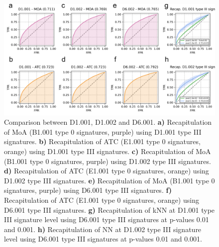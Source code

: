 \begin{figure}[htbp]
  \centering
  \includegraphics[width=1\linewidth]{figures/Protocols/Supplementary/FigS9_v2.png}
  \caption{
    Comparison between D1.001, D1.002 and D6.001.
    \textbf{a)} Recapitulation of MoA (B1.001 type 0 signatures, purple) using D1.001 type III signatures.
    \textbf{b)} Recapitulation of ATC (E1.001 type 0 signatures, orange) using D1.001 type III signatures.
    \textbf{c)} Recapitulation of MoA (B1.001 type 0 signatures, purple) using D1.002 type III signatures.
    \textbf{d)} Recapitulation of ATC (E1.001 type 0 signatures, orange) using D1.002 type III signatures. 
    \textbf{e)} Recapitulation of MoA (B1.001 type 0 signatures, purple) using D6.001 type III signatures.
    \textbf{f)} Recapitulation of ATC (E1.001 type 0 signatures, orange) using D6.001 type III signatures.
    \textbf{g)} Recapitulation of kNN at D1.001 type III signature level using D6.001 type III signatures at p-values 0.01 and 0.001.
    \textbf{h)} Recapitulation of NN at D1.002 type III signature level using D6.001 type III signatures at p-values 0.01 and 0.001.
  }
  \label{Protocols_FigS9}
\end{figure}



